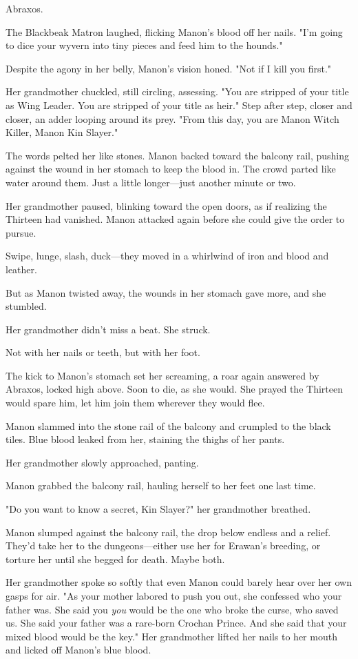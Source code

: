 Abraxos.

The Blackbeak Matron laughed, flicking Manon's blood off her nails. "I'm going to dice your wyvern into tiny pieces and feed him to the hounds."

Despite the agony in her belly, Manon's vision honed. "Not if I kill you first."

Her grandmother chuckled, still circling, assessing. "You are stripped of your title as Wing Leader. You are stripped of your title as heir." Step after step, closer and closer, an adder looping around its prey. "From this day, you are Manon Witch Killer, Manon Kin Slayer."

The words pelted her like stones. Manon backed toward the balcony rail, pushing against the wound in her stomach to keep the blood in. The crowd parted like water around them. Just a little longer---just another minute or two.

Her grandmother paused, blinking toward the open doors, as if realizing the Thirteen had vanished. Manon attacked again before she could give the order to pursue.

Swipe, lunge, slash, duck---they moved in a whirlwind of iron and blood and leather.

But as Manon twisted away, the wounds in her stomach gave more, and she stumbled.

Her grandmother didn't miss a beat. She struck.

Not with her nails or teeth, but with her foot.

The kick to Manon's stomach set her screaming, a roar again answered by Abraxos, locked high above. Soon to die, as she would. She prayed the Thirteen would spare him, let him join them wherever they would flee.

Manon slammed into the stone rail of the balcony and crumpled to the black tiles. Blue blood leaked from her, staining the thighs of her pants.

Her grandmother slowly approached, panting.

Manon grabbed the balcony rail, hauling herself to her feet one last time.

"Do you want to know a secret, Kin Slayer?" her grandmother breathed.

Manon slumped against the balcony rail, the drop below endless and a relief. They'd take her to the dungeons---either use her for Erawan's breeding, or torture her until she begged for death. Maybe both.

Her grandmother spoke so softly that even Manon could barely hear over her own gasps for air. "As your mother labored to push you out, she confessed who your father was. She said you  \emph{you} would be the one who broke the curse, who saved us. She said your father was a rare-born Crochan Prince. And she said that your mixed blood would be the key." Her grandmother lifted her nails to her mouth and licked off Manon's blue blood.

